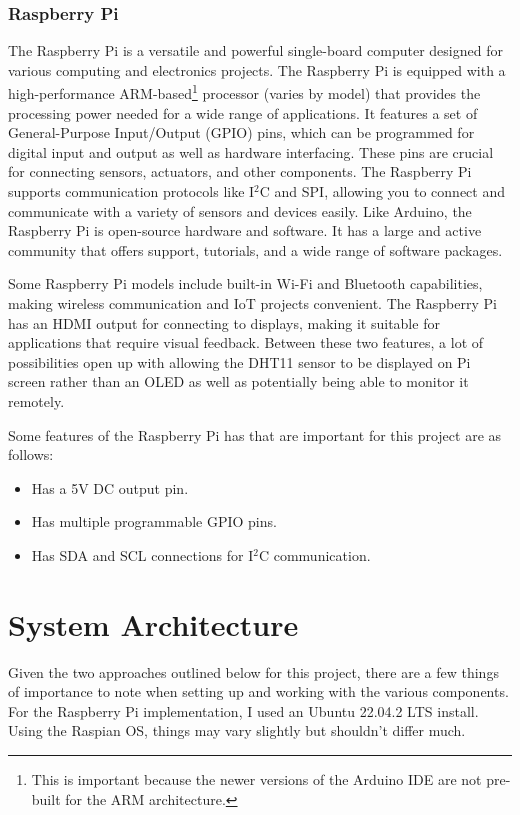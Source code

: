 \documentclass{article}
\begin{document}
\begin{multicols}{2}
		\subsubsection{Raspberry Pi}
		
		The Raspberry Pi is a versatile and powerful single-board computer designed for various computing and electronics projects. The Raspberry Pi is equipped with a high-performance ARM-based\footnote{This is important because the newer versions of the Arduino IDE are not pre-built for the ARM architecture.} processor (varies by model) that provides the processing power needed for a wide range of applications. It features a set of General-Purpose Input/Output (GPIO) pins, which can be programmed for digital input and output as well as hardware interfacing. These pins are crucial for connecting sensors, actuators, and other components. The Raspberry Pi supports communication protocols like I$^2$C and SPI, allowing you to connect and communicate with a variety of sensors and devices easily. Like Arduino, the Raspberry Pi is open-source hardware and software. It has a large and active community that offers support, tutorials, and a wide range of software packages.
		
		Some Raspberry Pi models include built-in Wi-Fi and Bluetooth capabilities, making wireless communication and IoT projects convenient. The Raspberry Pi has an HDMI output for connecting to displays, making it suitable for applications that require visual feedback. Between these two features, a lot of possibilities open up with allowing the DHT11 sensor to be displayed on Pi screen rather than an OLED as well as potentially being able to monitor it remotely.
		
		Some features of the Raspberry Pi has that are important for this project are as follows:
		\begin{itemize}[itemsep=1pt, parsep=1pt]
			\item Has a 5V DC output pin.
			\item Has multiple programmable GPIO pins.
			\item Has SDA and SCL connections for I$^2$C communication.
		\end{itemize}
		
		\section{System Architecture}
		Given the two approaches outlined below for this project, there are a few things of importance to note when setting up and working with the various components. For the Raspberry Pi implementation, I used an Ubuntu 22.04.2 LTS install. Using the Raspian OS, things may vary slightly but shouldn't differ much.
		

\end{multicols}
\end{document}
